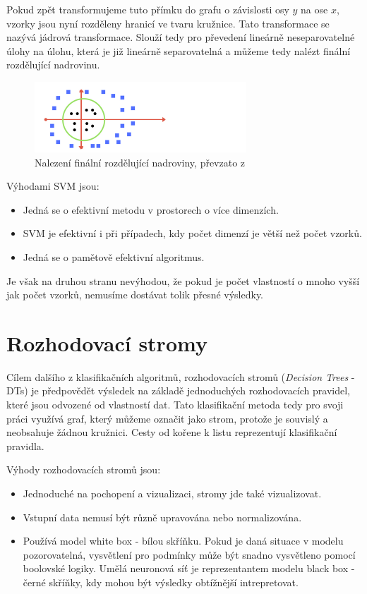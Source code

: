 Pokud zpět transformujeme tuto přímku do grafu o závislosti osy $y$ na ose $x$, vzorky jsou nyní rozděleny hranicí ve tvaru kružnice. Tato transformace se nazývá jádrová transformace. Slouží tedy pro převedení lineárně neseparovatelné úlohy na úlohu, která je již lineárně separovatelná a můžeme tedy nalézt finální rozdělující nadrovinu. \cite{MediumSVM}

\begin{figure}[!htbp]
    \centering
    \includegraphics[width=300px]{obrazky-figures/mediumsvm3.png}
    \caption{Nalezení finální rozdělující nadroviny, převzato z \cite{MediumSVM}}
\end{figure}

Výhodami SVM jsou: \cite{ScikitSVM}
\begin{itemize}
    \item Jedná se o efektivní metodu v prostorech o více dimenzích.
    \item SVM je efektivní i při případech, kdy počet dimenzí je větší než počet vzorků.
    \item Jedná se o pamětově efektivní algoritmus.
\end{itemize}

Je však na druhou stranu nevýhodou, že pokud je počet vlastností o mnoho vyšší jak počet vzorků, nemusíme dostávat tolik přesné výsledky. 

\section{Rozhodovací stromy}
Cílem dalšího z klasifikačních algoritmů, rozhodovacích stromů (\textit{Decision Trees} - DTs) je předpovědět výsledek na základě jednoduchých rozhodovacích pravidel, které jsou odvozené od vlastností dat. Tato klasifikační metoda tedy pro svoji práci využívá graf, který můžeme označit jako strom, protože je souvislý a neobsahuje žádnou kružnici. Cesty od kořene k listu reprezentují klasifikační pravidla. 

Výhody rozhodovacích stromů jsou: \cite{ScikitDTs}
\begin{itemize}
    \item Jednoduché na pochopení a vizualizaci, stromy jde také vizualizovat.
    \item Vstupní data nemusí být různě upravována nebo normalizována.
    \item Používá model white box - bílou skříňku. Pokud je daná situace v modelu pozorovatelná, vysvětlení pro podmínky může být snadno vysvětleno pomocí boolovské logiky. Umělá neuronová síť je reprezentantem modelu black box - černé skříňky, kdy mohou být výsledky obtížnější intrepretovat. 
\end{itemize}


